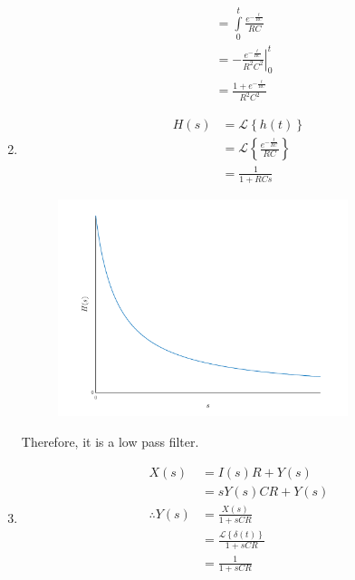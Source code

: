 \documentclass[fleqn, a4paper, 11pt, oneside]{amsart}
\theoremstyle{definition}
\theoremstyle{theorem}
\begin{document}
\begin{solution}
\begin{enumerate}[leftmargin=*]
\begin{align*}
                                     & = \int\limits_{0}^{t} \frac{e^{-\frac{t}{R C}}}{R C}         \\
                                     & = \left. -\frac{e^{-\frac{t}{R C}}}{R^2 C^2} \right|_{0}^{t} \\
                                     & = \frac{1 + e^{-\frac{t}{R C}}}{R^2 C^2}
			\end{align*}
		\item
			\begin{align*}
				H(s) & = \mathcal{L}\left\{ h(t) \right\}                           \\
                                     & = \mathcal{L}\left\{ \frac{e^{-\frac{t}{R C}}}{R C} \right\} \\
                                     & = \frac{1}{1 + R C s}
			\end{align*}
			\begin{figure}[H]
				\centering
				\includegraphics[width = 0.8\textwidth]{./plot1.pdf}
			\end{figure}
			Therefore, it is a low pass filter.
		\item
			\begin{align*}
				X(s)            & = I(s) R + Y(s)                                           \\
                                                & = s Y(s) C R + Y(s)                                       \\
				\therefore Y(s) & = \frac{X(s)}{1 + s C R}                                  \\
                                                & = \frac{\mathcal{L}\left\{ \delta(t) \right\}}{1 + s C R} \\
                                                & = \frac{1}{1 + s C R}
			\end{align*}
	\end{enumerate}
\end{solution}
\end{document}
